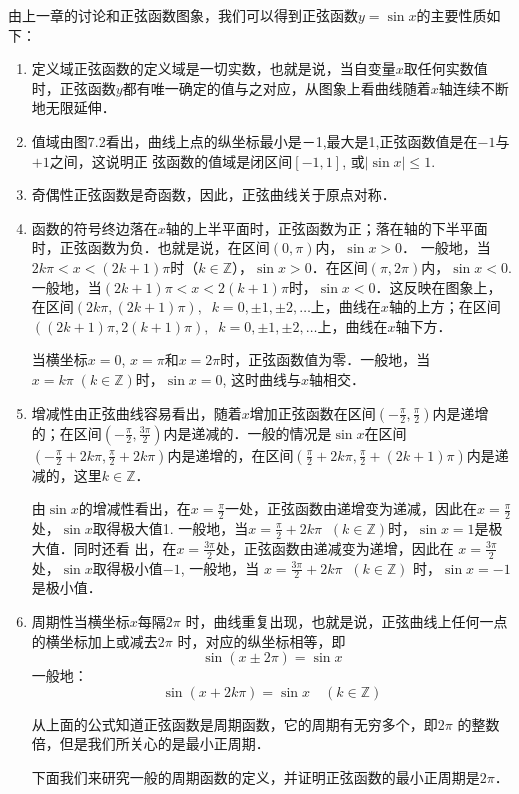 由上一章的讨论和正弦函数图象，我们可以得到正弦函数$y=\sin x$的主要性质如下：
\begin{enumerate}
    \item 定义域\quad 正弦函数的定义域是一切实数，也就是说，当自变量$x$取任何实数值时，正弦函数$y$都有唯一确定的值与之对应，从图象上看曲线随着$x$轴连续不断地无限延伸．
    \item 值域\quad 由图7.2看出，曲线上点的纵坐标最小是－1,最大是1,正弦函数值是在$-1$与$+1$之间，这说明正
    弦函数的值域是闭区间$[-1, 1]$, 或$|\sin x|\le 1$.
    \item 奇偶性\quad 正弦函数是奇函数，因此，正弦曲线关于原点对称．
    \item 函数的符号\quad 终边落在$x$轴的上半平面时，正弦函数为正；落在轴的下半平面时，正弦函数为负．也就是说，在区间$(0,\pi)$内，$\sin x>0$． 一般地，当$2k\pi <x<(2k+1)\pi$时（$k\in\mathbb{Z}$），$\sin x>0$．在区间$(\pi,2\pi)$内，$\sin x<0$. 一般地，当$(2k+1)\pi<x<2(k+1)\pi$时，$\sin x<0$．这反映在图象上，在区间$(2k\pi, (2k+1)\pi),\;\; k=0,\pm1,\pm2,\ldots$上，曲线在$x$轴的上方；在区间$((2k+1)\pi, 2(k+1)\pi),\;\; k=0,\pm1,\pm2,\ldots$上，曲线在$x$轴下方．
    
    当横坐标$x=0$, $x=\pi$和$x=2\pi$时，正弦函数值为零．一般地，当$x=k\pi\; (k\in \mathbb{Z})$时，$\sin x=0$, 这时曲线与$x$轴相交．

    \item 增减性\quad 由正弦曲线容易看出，随着$x$增加正弦函数在区间$\left(-\frac{\pi}{2},\frac{\pi}{2}\right)$内是递增的；在区间$\left(-\frac{\pi}{2},\frac{3\pi}{2}\right)$内是递减的．一般的情况是$\sin x$在区间$\left(-\frac{\pi}{2}+2k\pi,\frac{\pi}{2}+2k\pi\right)$内是递增的，在区间$\left(\frac{\pi}{2}+2k\pi,\frac{\pi}{2}+(2k+1)\pi\right)$内是递减的，这里$k\in \mathbb{Z}$．
    
    由$\sin x$的增减性看出，在$x=\frac{\pi}{2}$一处，正弦函数由递增变为递减，因此在$x=\frac{\pi}{2}$处，$\sin x$取得极大值1. 一般地，当$x=\frac{\pi}{2}+2k\pi\;\; (k\in\mathbb{Z})$时，$\sin x=1$是极大值．同时还看
    出，在$x=\frac{3\pi}{2}$处，正弦函数由递减变为递增，因此在
    $x=\frac{3\pi}{2}$处，$\sin x$取得极小值$-1$, 一般地，当
    $x=\frac{3\pi}{2}+2k\pi\;\; (k\in\mathbb{Z})$
    时，$\sin x=-1$是极小值．
    \item 周期性\quad 当横坐标$x$每隔$2\pi$ 时，曲线重复出现，也就是说，正弦曲线上任何一点的横坐标加上或减去$2\pi$ 时，对应的纵坐标相等，即
\[\sin(x\pm 2\pi)=\sin x\]
一般地：
\[\sin(x+2k\pi)=\sin x\quad (k\in\mathbb{Z})\]

从上面的公式知道正弦函数是周期函数，它的周期有无穷多个，即$2\pi$ 的整数倍，但是我们所关心的是最小正周期．

下面我们来研究一般的周期函数的定义，并证明正弦函数的最小正周期是$2\pi$．
\end{enumerate}

